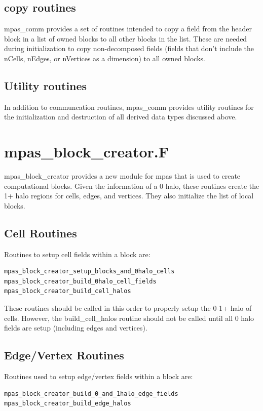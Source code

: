 \documentclass[11pt]{report}
\begin{document}
\subsection{copy routines}
mpas\_comm provides a set of routines intended to copy a field from the header block in a list of owned blocks to all other blocks in the list. These are needed during initialization to copy non-decomposed fields (fields that don't include the nCells, nEdges, or nVertices as a dimension) to all owned blocks.

\subsection{Utility routines}
In addition to communcation routines, mpas\_comm provides utility routines for the initialization and destruction of all derived data types discussed above.

\section{mpas\_block\_creator.F}
mpas\_block\_creator provides a new module for mpas that is used to create computational blocks. Given the information of a 0 halo, these routines create the 1+ halo regions for cells, edges, and vertices. They also initialize the list of local blocks.

\subsection{Cell Routines}
Routines to setup cell fields within a block are:
\begin{lstlisting}[language=fortran,escapechar=@,frame=single]
mpas_block_creator_setup_blocks_and_0halo_cells
mpas_block_creator_build_0halo_cell_fields
mpas_block_creator_build_cell_halos
\end{lstlisting}

These routines should be called in this order to properly setup the 0-1+ halo of cells. However, the build\_cell\_halos routine should not be called until all 0 halo fields are setup (including edges and vertices).

\subsection{Edge/Vertex Routines}
Routines used to setup edge/vertex fields within a block are:
\begin{lstlisting}[language=fortran,escapechar=@,frame=single]
mpas_block_creator_build_0_and_1halo_edge_fields
mpas_block_creator_build_edge_halos
\end{lstlisting}
\end{document}
